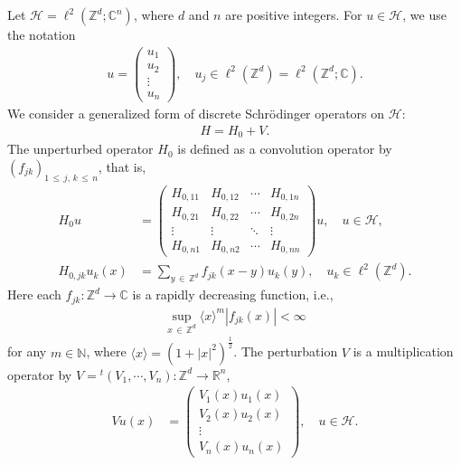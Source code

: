 \documentclass[10pt]{amsart}
\theoremstyle{definition}\newtheorem{defi}[theo]{Definition}\newtheorem{rema}[theo]{Remark}\newtheorem{exam}[theo]{Example}\newtheorem{exem}[theo]{Example}\newtheorem{nota}[theo]{Notation}
\newcommand{\Schr}{Schr\"odinger }
\newcommand{\C}{\mathbb{C}}
\newcommand{\R}{\mathbb{R}}
\newcommand{\Z}{\mathbb{Z}}
\newcommand{\bbN}{\mathbb{N}}
\newcommand{\HS}{\mathcal{H}}
\newcommand{\la}{\langle}
\newcommand{\ra}{\rangle}
\begin{document}
Let $\HS=\ell^2(\Z^d; \C^n)$, where $d$ and $n$ are positive integers. For $u \in \HS$, we use the notation
\begin{align*}
u=
\begin{pmatrix}
u_1 \\ u_2 \\ \vdots \\ u_n
\end{pmatrix}
, \quad u_j \in \ell^2\left(\Z^d\right)=\ell^2\left(\Z^d;\C\right).
\end{align*}
We consider a generalized form of discrete \Schr operators on $\HS$:
\begin{align*}
H=H_0+V.
\end{align*}
The unperturbed operator $H_0$ is defined as a convolution operator by $(f_{jk})_{1\,\leq\,j,\,k\,\leq\,n}$, that is,
\begin{align*}
H_0u &= 
\begin{pmatrix}
H_{0,11} & H_{0,12} & \cdots & H_{0,1n} \\
H_{0,21} & H_{0,22} & \cdots & H_{0,2n} \\
\vdots & \vdots & \ddots & \vdots \\
H_{0,n1} & H_{0,n2} & \cdots & H_{0,nn}
\end{pmatrix}
u, \quad u \in \HS, \\
H_{0,jk}u_k(x) &=\sum_{y\,\in\,\Z^d}f_{jk}(x-y)u_k(y), \quad u_k \in \ell^2\left(\Z^d\right).
\end{align*}
Here each $f_{jk}: \Z^d \rightarrow \C$ is a rapidly decreasing function, i.e.,
\begin{align*}
\sup_{x\,\in\,\Z^d} \la x \ra^m \left|f_{jk}(x)\right| <\infty
\end{align*}
for any $m\in\bbN$, where $\la x \ra = (1+|x|^2)^{\frac{1}{2}}$. The perturbation $V$ is a multiplication operator by $V={}^t(V_1,\cdots,V_n):\Z^d \to \R^n$,
\begin{align*}
Vu(x) &= 
\begin{pmatrix}
V_1(x) u_1(x) \\ V_2(x) u_2(x) \\ \vdots \\ V_n(x) u_n(x)
\end{pmatrix}
, \quad u \in \HS.
\end{align*}
\end{document}
